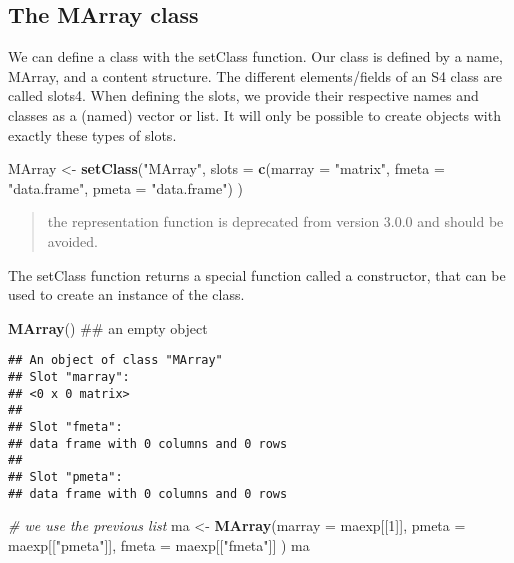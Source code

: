 \documentclass[]{article}
\newenvironment{Shaded}{\begin{snugshade}}{\end{snugshade}}
\newcommand{\CommentTok}[1]{\textcolor[rgb]{0.56,0.35,0.01}{\textit{#1}}}
\newcommand{\DataTypeTok}[1]{\textcolor[rgb]{0.13,0.29,0.53}{#1}}
\newcommand{\DecValTok}[1]{\textcolor[rgb]{0.00,0.00,0.81}{#1}}
\newcommand{\KeywordTok}[1]{\textcolor[rgb]{0.13,0.29,0.53}{\textbf{#1}}}
\newcommand{\NormalTok}[1]{#1}
\newcommand{\StringTok}[1]{\textcolor[rgb]{0.31,0.60,0.02}{#1}}
\begin{document}
\hypertarget{the-marray-class}{%
\subsection{The MArray class}\label{the-marray-class}}

We can deﬁne a class with the setClass function. Our class is deﬁned by
a name, MArray, and a content structure. The diﬀerent elements/ﬁelds of
an S4 class are called slots4. When deﬁning the slots, we provide their
respective names and classes as a (named) vector or list. It will only
be possible to create objects with exactly these types of slots.

\begin{Shaded}
\begin{Highlighting}[]
\NormalTok{MArray <-}\StringTok{ }\KeywordTok{setClass}\NormalTok{(}\StringTok{"MArray"}\NormalTok{,}
                   \DataTypeTok{slots =} \KeywordTok{c}\NormalTok{(}\DataTypeTok{marray =} \StringTok{"matrix"}\NormalTok{,}
                             \DataTypeTok{fmeta =} \StringTok{"data.frame"}\NormalTok{,}
                             \DataTypeTok{pmeta =} \StringTok{"data.frame"}\NormalTok{)}
\NormalTok{                       )}
\end{Highlighting}
\end{Shaded}

\begin{quote}
the representation function is deprecated from version 3.0.0 and should
be avoided.
\end{quote}

The setClass function returns a special function called a constructor,
that can be used to create an instance of the class.

\begin{Shaded}
\begin{Highlighting}[]
\KeywordTok{MArray}\NormalTok{() ## an empty object}
\end{Highlighting}
\end{Shaded}

\begin{verbatim}
## An object of class "MArray"
## Slot "marray":
## <0 x 0 matrix>
## 
## Slot "fmeta":
## data frame with 0 columns and 0 rows
## 
## Slot "pmeta":
## data frame with 0 columns and 0 rows
\end{verbatim}

\begin{Shaded}
\begin{Highlighting}[]
\CommentTok{# we use the previous list}
\NormalTok{ma <-}\StringTok{ }\KeywordTok{MArray}\NormalTok{(}\DataTypeTok{marray =}\NormalTok{ maexp[[}\DecValTok{1}\NormalTok{]],}
             \DataTypeTok{pmeta =}\NormalTok{ maexp[[}\StringTok{"pmeta"}\NormalTok{]],}
             \DataTypeTok{fmeta =}\NormalTok{ maexp[[}\StringTok{"fmeta"}\NormalTok{]]}
\NormalTok{             )}
\NormalTok{ma}
\end{Highlighting}
\end{Shaded}
\end{document}
